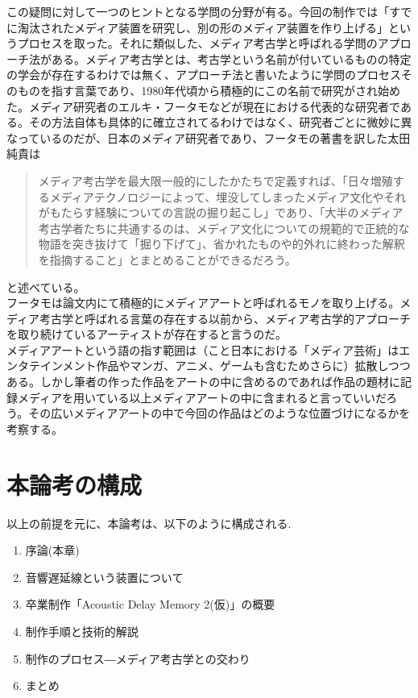 この疑問に対して一つのヒントとなる学問の分野が有る。今回の制作では「すでに淘汰されたメディア装置を研究し、別の形のメディア装置を作り上げる」というプロセスを取った。それに類似した、メディア考古学と呼ばれる学問のアプローチ法がある。メディア考古学とは、考古学という名前が付いているものの特定の学会が存在するわけでは無く、アプローチ法と書いたように学問のプロセスそのものを指す言葉であり、1980年代頃から積極的にこの名前で研究がされ始めた。メディア研究者のエルキ・フータモなどが現在における代表的な研究者である。その方法自体も具体的に確立されてるわけではなく、研究者ごとに微妙に異なっているのだが、日本のメディア研究者であり、フータモの著書を訳した太田純貴は

\begin{quote}
メディア考古学を最大限一般的にしたかたちで定義すれば、「日々増殖するメディアテクノロジーによって、埋没してしまったメディア文化やそれがもたらす経験についての言説の掘り起こし」であり、「大半のメディア考古学者たちに共通するのは、メディア文化についての規範的で正統的な物語を突き抜けて「掘り下げて」、省かれたものや的外れに終わった解釈を指摘すること」とまとめることができるだろう。
\end{quote}

と述べている。\\
フータモは論文内にて積極的にメディアアートと呼ばれるモノを取り上げる。メディア考古学と呼ばれる言葉の存在する以前から、メディア考古学的アプローチを取り続けているアーティストが存在すると言うのだ。\\
メディアアートという語の指す範囲は（こと日本における「メディア芸術」はエンタテインメント作品やマンガ、アニメ、ゲームも含むためさらに）拡散しつつある。しかし筆者の作った作品をアートの中に含めるのであれば作品の題材に記録メディアを用いている以上メディアアートの中に含まれると言っていいだろう。その広いメディアアートの中で今回の作品はどのような位置づけになるかを考察する。\\

\section{本論考の構成}\label{ux672cux8ad6ux8003ux306eux69cbux6210}

以上の前提を元に、本論考は、以下のように構成される.

\begin{enumerate}
\def\labelenumi{\arabic{enumi}.}
\tightlist
\item
  序論(本章)
\item
  音響遅延線という装置について
\item
  卒業制作「Acoustic Delay Memory 2(仮)」の概要
\item
  制作手順と技術的解説
\item
  制作のプロセス―メディア考古学との交わり
\item
  まとめ
\end{enumerate}

